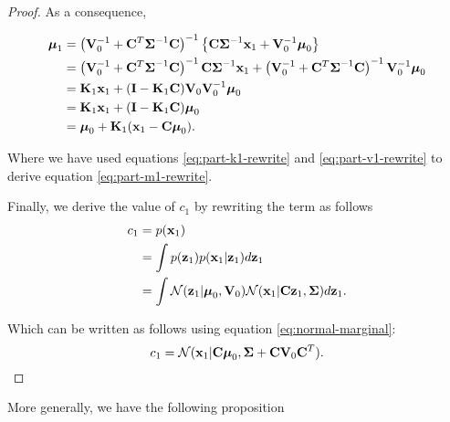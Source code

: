 \documentclass[11pt]{article}
\numberwithin{equation}{section}
\newcommand{\x}{{\bf x}}
\newcommand{\z}{{\bf z}}
\newcommand{\N}{\mathcal{N}}
\begin{document}
\begin{proof}
	As a consequence,

	\begin{align}
		\boldsymbol{\mu}_1 &= \left({\bf V}_0^{-1} + {\bf C}^T\boldsymbol{\Sigma}^{-1} {\bf C}\right)^{-1} \left\{{\bf C}\boldsymbol\Sigma^{-1}\x_1 + {\bf V}_0^{-1}\boldsymbol\mu_0\right\}\\
		&= \left({\bf V}_0^{-1} + {\bf C}^T\boldsymbol{\Sigma}^{-1} {\bf C}\right)^{-1} {\bf C}\boldsymbol\Sigma^{-1}\x_1 + \left({\bf V}_0^{-1} + {\bf C}^T\boldsymbol{\Sigma}^{-1} {\bf C}\right)^{-1} {\bf V}_0^{-1}\boldsymbol\mu_0\\
		&= {\bf K}_1\x_1 + ({\bf I} - {\bf K}_1{\bf C}){\bf V}_0 {\bf V}_0^{-1}\boldsymbol\mu_0 \label{eq:part-m1-rewrite}\\
		&= {\bf K}_1\x_1 + ({\bf I} - {\bf K}_1{\bf C})\boldsymbol\mu_0 \\
		&= \boldsymbol{\mu}_0 + {\bf K}_1(\x_1 -{\bf C}\boldsymbol\mu_0).
	\end{align}
	
	Where we have used equations \eqref{eq:part-k1-rewrite} and \eqref{eq:part-v1-rewrite} to derive equation \eqref{eq:part-m1-rewrite}.
	
	Finally, we derive the value of $c_1$ by rewriting the term as follows
	\begin{align}
		c_1 &= p(\x_1)\\
			&= \int p(\z_1) p (\x_1 \vert \z_1) d\z_1\\
			&= \int \N(\z_1\vert \boldsymbol\mu_0, {\bf V}_0) \N(\x_1 \vert {\bf C}\z_1, \boldsymbol\Sigma) d\z_1.
	\end{align}
	
	Which can be written as follows using equation \eqref{eq:normal-marginal}:
	\begin{equation}
		c_1 = \N(\x_1 \vert {\bf C}\boldsymbol\mu_0, \boldsymbol\Sigma + {\bf C}{\bf V}_0 {\bf C}^T).
	\end{equation}
\end{proof}


More generally, we have the following proposition
\end{document}
